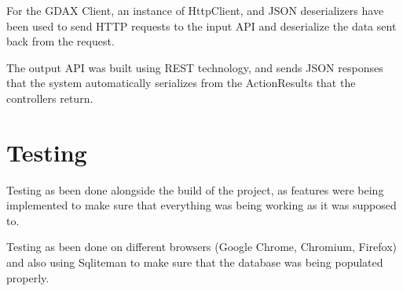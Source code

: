 \captionsetup{type=figure}


For the GDAX Client, an instance of HttpClient, and JSON deserializers have been used to send HTTP requests to the input API and deserialize the data sent back from the request.

The output API was built using REST technology, and sends JSON responses that the system automatically serializes from the ActionResults that the controllers return.
\section{Testing}
Testing as been done alongside the build of the project, as features were being implemented to make sure that everything was being working as it was supposed to.

Testing as been done on different browsers (Google Chrome, Chromium, Firefox) and also using Sqliteman to make sure that the database was being populated properly.